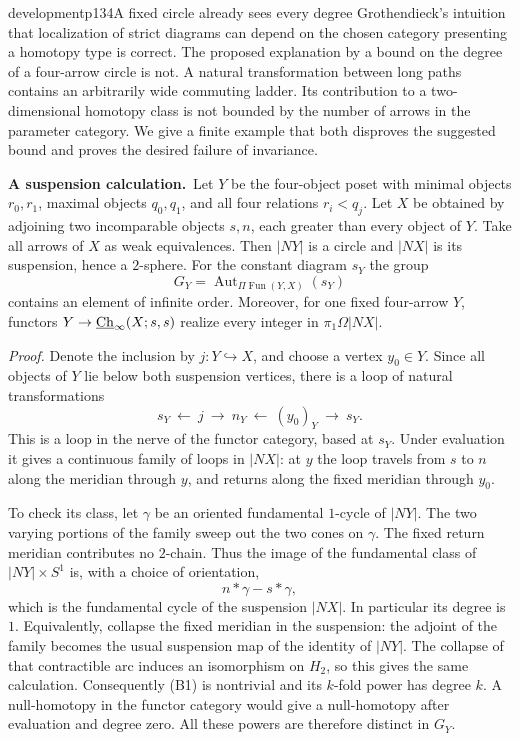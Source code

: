 \begin{dcomment}{development}{p134}{A fixed circle already sees every degree}
Grothendieck's intuition that localization of strict diagrams can depend on the chosen category presenting a homotopy type is correct. The proposed explanation by a bound on the degree of a four-arrow circle is not. A natural transformation between long paths contains an arbitrarily wide commuting ladder. Its contribution to a two-dimensional homotopy class is not bounded by the number of arrows in the parameter category. We give a finite example that both disproves the suggested bound and proves the desired failure of invariance.

\textbf{A suspension calculation.}\ours\ Let $Y$ be the four-object poset with minimal objects $r_0,r_1$, maximal objects $q_0,q_1$, and all four relations $r_i<q_j$. Let $X$ be obtained by adjoining two incomparable objects $s,n$, each greater than every object of $Y$. Take all arrows of $X$ as weak equivalences. Then $|NY|$ is a circle and $|NX|$ is its suspension, hence a $2$-sphere. For the constant diagram $s_Y$ the group
\[
 G_Y=\operatorname{Aut}_{\Pi\operatorname{Fun}(Y,X)}(s_Y)
\]
contains an element of infinite order. Moreover, for one fixed four-arrow $Y$, functors $Y\to\underline{\mathrm{Ch}}_\infty(X;s,s)$ realize every integer in $\pi_1\Omega|NX|$.

\emph{Proof.} Denote the inclusion by $j:Y\hookrightarrow X$, and choose a vertex $y_0\in Y$. Since all objects of $Y$ lie below both suspension vertices, there is a loop of natural transformations
\[
 s_Y\ \longleftarrow\ j\ \longrightarrow\ n_Y
       \ \longleftarrow\ (y_0)_Y\ \longrightarrow\ s_Y.       \tag{B1}
\]
This is a loop in the nerve of the functor category, based at $s_Y$. Under evaluation it gives a continuous family of loops in $|NX|$: at $y$ the loop travels from $s$ to $n$ along the meridian through $y$, and returns along the fixed meridian through $y_0$.

To check its class, let $\gamma$ be an oriented fundamental $1$-cycle of $|NY|$. The two varying portions of the family sweep out the two cones on $\gamma$. The fixed return meridian contributes no $2$-chain. Thus the image of the fundamental class of $|NY|\times S^1$ is, with a choice of orientation,
\[
                    n*\gamma-s*\gamma,
\]
which is the fundamental cycle of the suspension $|NX|$. In particular its degree is $1$. Equivalently, collapse the fixed meridian in the suspension: the adjoint of the family becomes the usual suspension map of the identity of $|NY|$. The collapse of that contractible arc induces an isomorphism on $H_2$, so this gives the same calculation. Consequently (B1) is nontrivial and its $k$-fold power has degree $k$. A null-homotopy in the functor category would give a null-homotopy after evaluation and degree zero. All these powers are therefore distinct in $G_Y$.


\end{dcomment}

